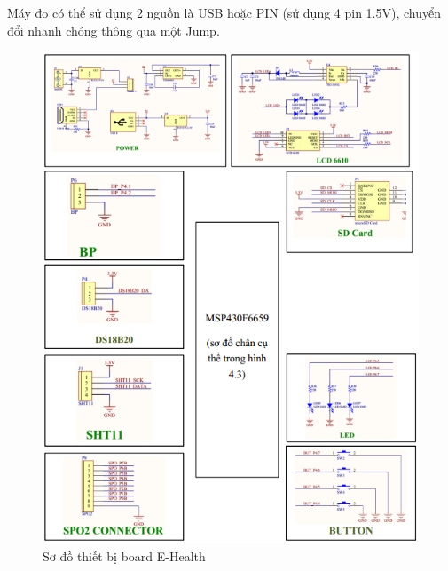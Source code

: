 \documentclass{report}
\begin{document}
Máy đo có thể sử dụng 2 nguồn là USB hoặc PIN (sử dụng 4 pin 1.5V), chuyển đổi nhanh chóng thông qua một Jump. 
\newpage
\begin{figure}[h]
	\centering
	\includegraphics[scale = 0.85]{fig41.png}
	\caption{Sơ đồ thiết bị board E-Health}
	\label{fig:Graph41}
\end{figure}
\end{document}
